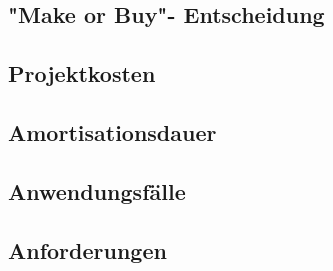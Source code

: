 \subsection{"Make or Buy"- Entscheidung}
\label{makeOrBuy}

\subsection{Projektkosten}
\label{projektkosten}

\subsection{Amortisationsdauer}
\label{amortisationsdauer}

\subsection{Anwendungsfälle}
\label{anwednungsfaelle}

\subsection{Anforderungen}
\label{anforderungen}


